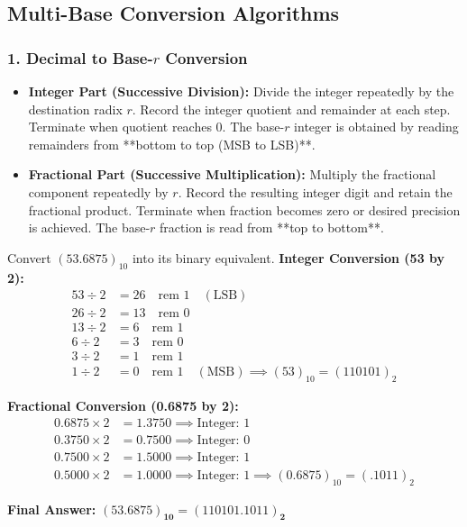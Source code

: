 \subsection{Multi-Base Conversion Algorithms}

\subsubsection{1. Decimal to \texorpdfstring{Base-$r$}{Base-r} Conversion}
\begin{itemize}
    \item \textbf{Integer Part (Successive Division):} Divide the integer repeatedly by the destination radix $r$. Record the integer quotient and remainder at each step. Terminate when quotient reaches $0$. The base-$r$ integer is obtained by reading remainders from **bottom to top (MSB to LSB)**.
    \item \textbf{Fractional Part (Successive Multiplication):} Multiply the fractional component repeatedly by $r$. Record the resulting integer digit and retain the fractional product. Terminate when fraction becomes zero or desired precision is achieved. The base-$r$ fraction is read from **top to bottom**.
\end{itemize}

\begin{example}
Convert $(53.6875)_{10}$ into its binary equivalent.
\tcblower
\textbf{Integer Conversion (53 by 2):}
\begin{align*}
    53 \div 2 &= 26 \quad \text{rem } 1 \quad (\text{LSB}) \\
    26 \div 2 &= 13 \quad \text{rem } 0 \\
    13 \div 2 &= 6 \quad \text{rem } 1 \\
    6 \div 2 &= 3 \quad \text{rem } 0 \\
    3 \div 2 &= 1 \quad \text{rem } 1 \\
    1 \div 2 &= 0 \quad \text{rem } 1 \quad (\text{MSB}) \implies (53)_{10} = (110101)_2
\end{align*}

\textbf{Fractional Conversion (0.6875 by 2):}
\begin{align*}
    0.6875 \times 2 &= 1.3750 \implies \text{Integer: } 1 \\
    0.3750 \times 2 &= 0.7500 \implies \text{Integer: } 0 \\
    0.7500 \times 2 &= 1.5000 \implies \text{Integer: } 1 \\
    0.5000 \times 2 &= 1.0000 \implies \text{Integer: } 1 \implies (0.6875)_{10} = (.1011)_2
\end{align*}

\textbf{Final Answer:} $\mathbf{(53.6875)_{10} = (110101.1011)_2}$
\end{example}

